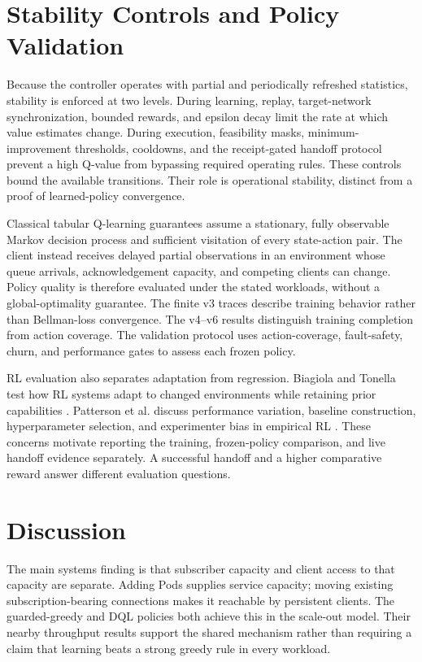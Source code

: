 \section{Stability Controls and Policy Validation}

Because the controller operates with partial and periodically refreshed
statistics, stability is enforced at two levels.  During learning, replay,
target-network synchronization, bounded rewards, and epsilon decay limit the
rate at which value estimates change.  During execution, feasibility masks,
minimum-improvement thresholds, cooldowns, and the receipt-gated handoff protocol
prevent a high Q-value from bypassing required operating rules. These controls
bound the available transitions. Their role is operational stability, distinct
from a proof of learned-policy convergence.

Classical tabular Q-learning guarantees assume a stationary, fully observable
Markov decision process and sufficient visitation of every state-action pair.
The client instead receives delayed partial observations in an environment
whose queue arrivals, acknowledgement capacity, and competing clients can
change. Policy quality is therefore evaluated under the stated workloads,
without a global-optimality guarantee. The finite v3 traces describe training
behavior rather than Bellman-loss convergence. The v4--v6 results distinguish
training completion from action coverage. The validation protocol uses
action-coverage, fault-safety, churn, and performance gates to assess each
frozen policy.

RL evaluation also separates adaptation from regression. Biagiola and Tonella
test how RL systems adapt to changed environments while retaining prior
capabilities \cite{Biagiola2022Plasticity}. Patterson et al. discuss performance
variation, baseline construction, hyperparameter selection, and experimenter
bias in empirical RL \cite{Patterson2024EmpiricalDesign}. These concerns motivate
reporting the training, frozen-policy comparison, and live handoff evidence
separately. A successful handoff and a higher comparative reward answer
different evaluation questions.

\section{Discussion}

The main systems finding is that subscriber capacity and client access to that
capacity are separate. Adding Pods supplies service capacity; moving existing
subscription-bearing connections makes it reachable by persistent clients.
The guarded-greedy and DQL policies both achieve this in the scale-out model.
Their nearby throughput results support the shared mechanism rather than
requiring a claim that learning beats a strong greedy rule in every workload.

